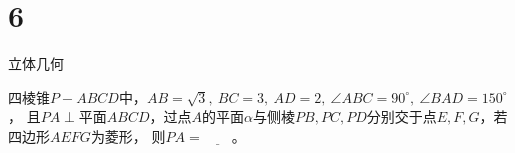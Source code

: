 \chapter{6}{立体几何}

\begin{exercise}
 四棱锥$P-ABCD$中，$AB=\sqrt{3},\ BC=3,\ AD=2,\ \angle ABC=90^\circ,\ \angle BAD=150^\circ$，
 且$PA\perp$平面$ABCD$，过点$A$的平面$\alpha$与侧棱$PB,PC,PD$分别交于点$E,F,G$，若四边形$AEFG$为菱形，
 则$PA=\underline{\quad\quad}$。
\end{exercise}
